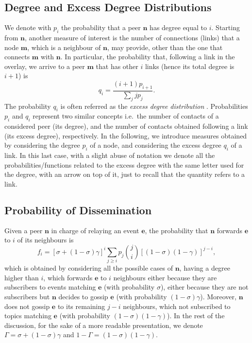 \documentclass[10pt, conference, compsocconf]{IEEEtran}
\begin{document}
\subsection{Degree and Excess Degree Distributions}

We denote with $p_i$ the probability that a peer $\mathbf{n}$ has degree equal to $i$. Starting from $\mathbf{n}$, another measure of interest is the number of connections (links) that a node $\mathbf{m}$, which is a neighbour of $\mathbf{n}$, may provide, other than the one that connects $\mathbf{m}$ with $\mathbf{n}$. In particular, the probability that, following a link in the overlay, we arrive to a peer $\mathbf{m}$ that has other $i$ links (hence its total degree is $i+1$) is
$$q_i = \frac{(i+1)p_{i+1}}{\sum_j j p_j}.$$
The probability $q_i$ is often referred as the \emph{excess degree distribution} \cite{newman03thestructure}. Probabilities $p_i$ and $q_i$ represent two similar concepts i.e.~the number of contacts of a considered peer (its degree), and the number of contacts obtained following a link (its excess degree), respectively. In the following, we introduce measures obtained by considering the degree $p_i$ of a node, and considering the excess degree $q_i$ of a link. In this last case, with a slight abuse of notation we denote all the probabilities/functions related to the excess degree with the same letter used for the degree, with an arrow on top of it, just to recall that the quantity refers to a link.

\subsection{Probability of Dissemination}

Given a peer $\mathbf{n}$ in charge of relaying an event $\mathbf{e}$, the probability that $\mathbf{n}$ forwards $\mathbf{e}$ to $i$ of its neighbours is
\begin{equation}\label{eq:f_k}
  f_i = [\sigma + (1-\sigma)\gamma]^i \sum_{j \geq i} p_j \binom{j}{i} [(1-\sigma)(1-\gamma)]^{j-i},
\end{equation}
which is obtained by considering all the possible cases of $\mathbf{n}$, having a degree higher than $i$, which forwards $\mathbf{e}$ to $i$ neighbours either because they are subscribers to events matching $\mathbf{e}$ (with probability $\sigma$), either because they are not subscribers but $\mathbf{n}$ decides to gossip $\mathbf{e}$ (with probability $(1-\sigma)\gamma$). Moreover, $\mathbf{n}$ does not gossip $\mathbf{e}$ to its remaining $j-i$ neighbours, which not subscribed to topics matching $\mathbf{e}$ (with probability $(1-\sigma)(1-\gamma)$).
In the rest of the discussion, for the sake of a more readable presentation, we denote $\Gamma = \sigma + (1-\sigma)\gamma$ and $1 - \Gamma = (1-\sigma)(1-\gamma)$.
\end{document}
